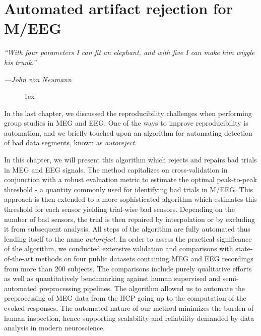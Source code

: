 \chapter{Automated artifact rejection for M/EEG}
\label{chapter:autoreject}

\epigraph{\small\itshape ``With four parameters I can fit an elephant, and with five I can make him wiggle his trunk.''}{\small\textit{---John von Neumann}}

\begin{figure}[ht!]
\centering
\begingroup
\etocstandardlines
\renewcommand{\etocbelowtocskip}{0pt\relax}
\fboxsep1ex
\localtableofcontents
\endgroup
\end{figure}

\clearpage

In the last chapter, we discussed the reproducibility challenges when performing group studies in \ac{MEG} and \ac{EEG}. One of the ways to improve reproducibility is automation, and we briefly touched upon an algorithm for automating detection of bad data segments, known as \emph{autoreject}.

In this chapter, we will present this algorithm which rejects and repairs bad trials in \ac{MEG} and \ac{EEG} signals. The method capitalizes on cross-validation in conjunction with a robust evaluation metric to estimate the optimal peak-to-peak threshold - a quantity commonly used for identifying bad trials in M/EEG. This approach is then extended to a more sophisticated algorithm which estimates this threshold for each sensor yielding trial-wise bad sensors. Depending on the number of bad sensors, the trial is then repaired by interpolation or by excluding it from subsequent analysis. All steps of the algorithm are fully automated thus lending itself to the name \emph{autoreject}. In order to assess the practical significance of the algorithm, we conducted extensive validation and comparisons with state-of-the-art methods on four public datasets containing \ac{MEG} and \ac{EEG} recordings from more than 200 subjects. The comparisons include purely qualitative efforts as well as quantitatively benchmarking against human supervised and semi-automated preprocessing pipelines. The algorithm allowed us to automate the preprocessing of \ac{MEG} data from the \ac{HCP} going up to the computation of the evoked responses. The automated nature of our method minimizes the burden of human inspection, hence supporting scalability and reliability demanded by data analysis in modern neuroscience.

